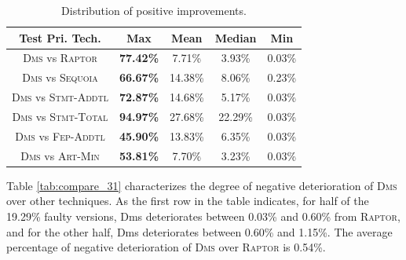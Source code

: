 \begin{table}[tbp]
    \centering
		\caption{Distribution of positive improvements.}
		\renewcommand{\arraystretch}{1.5}
		\small
        \begin{tabular}{|c|c|c|c|c|}
			\hline
			Test Pri. Tech.  &        Max &       Mean &     Median &        Min \\
			\hline\hline
			\textsc{Dms} vs \textsc{Raptor} & {\bf 77.42\%} &     7.71\% &     3.93\% &     0.03\% \\
			\hline
			\textsc{Dms} vs \textsc{Sequoia} & {\bf 66.67\%} &    14.38\% &     8.06\% &     0.23\% \\
			\hline
			\textsc{Dms} vs \textsc{Stmt-Addtl} & {\bf 72.87\%} &    14.68\% &     5.17\% &     0.03\% \\
			\hline
			\textsc{Dms} vs \textsc{Stmt-Total} & {\bf 94.97\%} &    27.68\% &    22.29\% &     0.03\% \\
			\hline
			\textsc{Dms} vs \textsc{Fep-Addtl} & {\bf 45.90\%} &    13.83\% &     6.35\% &     0.03\% \\
			\hline
			\textsc{Dms} vs \textsc{Art-Min} & {\bf 53.81\%} &     7.70\% &     3.23\% &     0.03\% \\
			\hline
		\end{tabular}
    \label{tab:compare_21}
\end{table}

Table \ref{tab:compare_31} characterizes the degree of negative deterioration of
\textsc{Dms} over other techniques. As the first row in the table indicates, for half of the 19.29\%
faulty versions, {\sc Dms} deteriorates 
between 0.03\% and 0.60\% from \textsc{Raptor}, and for the other half,
{\sc Dms} deteriorates between 0.60\% and 1.15\%. The average
percentage of negative deterioration of \textsc{Dms} over \textsc{Raptor} is 0.54\%.

